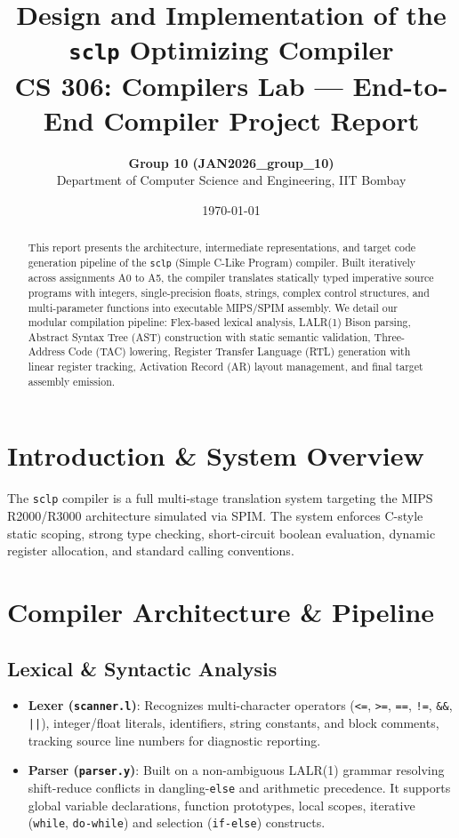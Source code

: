 \documentclass[10pt,twocolumn,a4paper]{article}
\title{\vspace{-1.5em}\textbf{\Large Design and Implementation of the \texttt{sclp} Optimizing Compiler}\\[0.2em]
\large CS 306: Compilers Lab --- End-to-End Compiler Project Report}
\author{\textbf{Group 10 (JAN2026\_group\_10)} \\ Department of Computer Science and Engineering, IIT Bombay}
\date{\vspace{-0.8em}\today}
\begin{document}
\maketitle

\begin{abstract}
This report presents the architecture, intermediate representations, and target code generation pipeline of the \texttt{sclp} (Simple C-Like Program) compiler. Built iteratively across assignments A0 to A5, the compiler translates statically typed imperative source programs with integers, single-precision floats, strings, complex control structures, and multi-parameter functions into executable MIPS/SPIM assembly. We detail our modular compilation pipeline: Flex-based lexical analysis, LALR(1) Bison parsing, Abstract Syntax Tree (AST) construction with static semantic validation, Three-Address Code (TAC) lowering, Register Transfer Language (RTL) generation with linear register tracking, Activation Record (AR) layout management, and final target assembly emission.
\end{abstract}

\section{Introduction \& System Overview}
The \texttt{sclp} compiler is a full multi-stage translation system targeting the MIPS R2000/R3000 architecture simulated via SPIM. The system enforces C-style static scoping, strong type checking, short-circuit boolean evaluation, dynamic register allocation, and standard calling conventions.

\begin{center}
\end{center}

\section{Compiler Architecture \& Pipeline}

\subsection{Lexical \& Syntactic Analysis}
\begin{itemize}
    \item \textbf{Lexer (\texttt{scanner.l})}: Recognizes multi-character operators (\texttt{<=}, \texttt{>=}, \texttt{==}, \texttt{!=}, \texttt{\&\&}, \texttt{||}), integer/float literals, identifiers, string constants, and block comments, tracking source line numbers for diagnostic reporting.
    \item \textbf{Parser (\texttt{parser.y})}: Built on a non-ambiguous LALR(1) grammar resolving shift-reduce conflicts in dangling-\texttt{else} and arithmetic precedence. It supports global variable declarations, function prototypes, local scopes, iterative (\texttt{while}, \texttt{do-while}) and selection (\texttt{if-else}) constructs.
\end{itemize}
\end{document}
